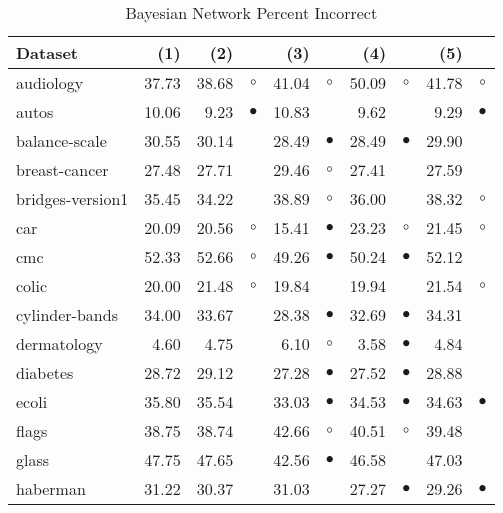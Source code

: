 \newpage
{\centering \footnotesize \begin{longtable}{lrr@{\hspace{0.1cm}}cr@{\hspace{0.1cm}}cr@{\hspace{0.1cm}}cr@{\hspace{0.1cm}}c}
\caption{\label{bnpi}Bayesian Network Percent Incorrect}
\\
\hline
Dataset & (1)& (2) & & (3) & & (4) & & (5) & \\
\hline
audiology & 37.73 & 38.68 &   $\circ$ & 41.04 &    $\circ$ & 50.09 &    $\circ$ & 41.78 &    $\circ$\\
autos & 10.06 &  9.23 & $\bullet$ & 10.83 &            &  9.62 &            &  9.29 &  $\bullet$\\
balance-scale & 30.55 & 30.14 &           & 28.49 &  $\bullet$ & 28.49 &  $\bullet$ & 29.90 &           \\
breast-cancer & 27.48 & 27.71 &           & 29.46 &    $\circ$ & 27.41 &            & 27.59 &           \\
bridges-version1 & 35.45 & 34.22 &           & 38.89 &    $\circ$ & 36.00 &            & 38.32 &    $\circ$\\
car & 20.09 & 20.56 &   $\circ$ & 15.41 &  $\bullet$ & 23.23 &    $\circ$ & 21.45 &    $\circ$\\
cmc & 52.33 & 52.66 &   $\circ$ & 49.26 &  $\bullet$ & 50.24 &  $\bullet$ & 52.12 &           \\
colic & 20.00 & 21.48 &   $\circ$ & 19.84 &            & 19.94 &            & 21.54 &    $\circ$\\
cylinder-bands & 34.00 & 33.67 &           & 28.38 &  $\bullet$ & 32.69 &  $\bullet$ & 34.31 &           \\
dermatology &  4.60 &  4.75 &           &  6.10 &    $\circ$ &  3.58 &  $\bullet$ &  4.84 &           \\
diabetes & 28.72 & 29.12 &           & 27.28 &  $\bullet$ & 27.52 &  $\bullet$ & 28.88 &           \\
ecoli & 35.80 & 35.54 &           & 33.03 &  $\bullet$ & 34.53 &  $\bullet$ & 34.63 &  $\bullet$\\
flags & 38.75 & 38.74 &           & 42.66 &    $\circ$ & 40.51 &    $\circ$ & 39.48 &           \\
glass & 47.75 & 47.65 &           & 42.56 &  $\bullet$ & 46.58 &            & 47.03 &           \\
haberman & 31.22 & 30.37 &           & 31.03 &            & 27.27 &  $\bullet$ & 29.26 &  $\bullet$\\

\end{longtable}}
